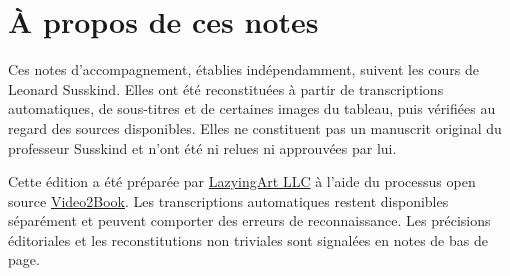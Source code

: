 \documentclass[11pt,oneside]{book}
\begin{document}
\frontmatter
\hypersetup{pageanchor=false}

\hypersetup{pageanchor=true}

\clearpage
\chapter*{À propos de ces notes}
Ces notes d’accompagnement, établies indépendamment, suivent les cours de Leonard Susskind. Elles ont été reconstituées à partir de transcriptions automatiques, de sous-titres et de certaines images du tableau, puis vérifiées au regard des sources disponibles. Elles ne constituent pas un manuscrit original du professeur Susskind et n’ont été ni relues ni approuvées par lui.

Cette édition a été préparée par \href{https://lazying.art}{LazyingArt LLC} à l’aide du processus open source \href{https://github.com/lachlanchen/Video2Book}{Video2Book}. Les transcriptions automatiques restent disponibles séparément et peuvent comporter des erreurs de reconnaissance. Les précisions éditoriales et les reconstitutions non triviales sont signalées en notes de bas de page.
\clearpage
\tableofcontents
\mainmatter








\end{document}
